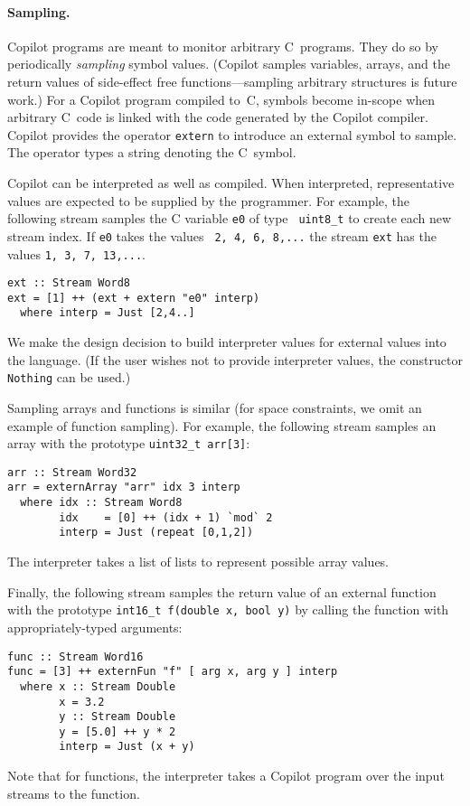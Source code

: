 \paragraph{Sampling.}
Copilot programs are meant to monitor arbitrary C~programs.  They do
so by
periodically \emph{sampling} symbol values. (Copilot samples variables, arrays,
and the return values of side-effect free functions---sampling arbitrary
structures is future work.)  For a Copilot program compiled to~C, symbols become
in-scope when arbitrary C~code is linked with the code generated by the Copilot
compiler.  Copilot provides the operator {\tt extern} to introduce an external
symbol to sample.  The operator types a string denoting the C~symbol.

Copilot can be interpreted as well as compiled.  When interpreted,
representative values are expected to be supplied by the programmer.  For
example, the following stream samples the C variable {\tt e0} of type {\tt
  uint8\_t} to create each new stream index.  If {\tt e0} takes the values {\tt
  2, 4, 6, 8,...}  the stream {\tt ext} has the values {\tt 1, 3, 7, 13,...}.
%
\begin{lstlisting}[frame=single]
ext :: Stream Word8
ext = [1] ++ (ext + extern "e0" interp)
  where interp = Just [2,4..]
\end{lstlisting}
%
We make the design decision to build interpreter values for external values
into the language.  (If the user wishes not to provide interpreter values,
the constructor {\tt Nothing} can be used.)

Sampling arrays and functions is similar (for space constraints, we omit an
example of function sampling).  For example, the following stream samples an
array with the prototype {\tt uint32\_t arr[3]}:
%
\begin{lstlisting}[frame=single]
arr :: Stream Word32
arr = externArray "arr" idx 3 interp
  where idx :: Stream Word8
        idx    = [0] ++ (idx + 1) `mod` 2
        interp = Just (repeat [0,1,2])
\end{lstlisting}
The interpreter takes a list of lists to represent possible array values.

Finally, the following stream samples the return value of an external function
with the prototype {\tt int16\_t f(double x, bool y)} by calling the function
with appropriately-typed arguments:
%
\begin{lstlisting}[frame=single]
func :: Stream Word16
func = [3] ++ externFun "f" [ arg x, arg y ] interp
  where x :: Stream Double
        x = 3.2
        y :: Stream Double
        y = [5.0] ++ y * 2
        interp = Just (x + y)
\end{lstlisting}
%
Note that for functions, the interpreter takes a Copilot program over the input
streams to the function.


